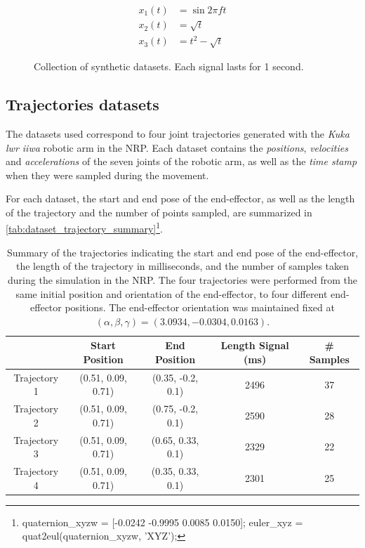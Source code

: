 \documentclass[10pt,a4paper, final]{report} %
\begin{document}
\begin{align}
x_1(t) &= \sin{2 \pi f t} \label{eq:zx1}\\
x_2(t) &= \sqrt{t} \label{eq:zx2}\\
x_3(t) &= t^2 - \sqrt{t} \label{eq:zx3}
\end{align}

\begin{figure}[!h]
\caption{Collection of synthetic datasets. Each signal lasts for 1 second.}
\label{fig:synthetic_datasets}
\end{figure}

\subsection{Trajectories datasets}
The datasets used correspond to four joint trajectories generated with the \textit{Kuka lwr iiwa} robotic arm in the NRP. Each dataset contains the \textit{positions}, \textit{velocities} and \textit{accelerations} of the seven joints of the robotic arm, as well as the \textit{time stamp} when they were sampled during the movement. 

For each dataset, the start and end pose of the end-effector, as well as the length of the trajectory and the number of points sampled, are summarized in \autoref{tab:dataset_trajectory_summary}\footnote{quaternion\_xyzw = [-0.0242 -0.9995 0.0085 0.0150];  euler\_xyz = quat2eul(quaternion\_xyzw, 'XYZ');}. 

\begin{table}[H]
\centering
\caption{Summary of the trajectories indicating the start and end pose of the end-effector, the length of the trajectory in milliseconds, and the number of samples taken during the simulation in the NRP. The four trajectories were performed from the same initial position and orientation of the end-effector, to four different end-effector positions. The end-effector orientation was maintained fixed at $(\alpha, \beta, \gamma) = (3.0934, -0.0304, 0.0163)$.}
\begin{tabular}{ccccc}
\toprule
             & Start Position        & End Position          & Length Signal (ms) & \# Samples \\
\midrule
Trajectory 1 & (0.51, 0.09, 0.71) & (0.35, -0.2, 0.1) & 2496               & 37         \\
Trajectory 2 & (0.51, 0.09, 0.71) & (0.75, -0.2, 0.1) & 2590               & 28         \\
Trajectory 3 & (0.51, 0.09, 0.71) & (0.65, 0.33, 0.1) & 2329               & 22         \\
Trajectory 4 & (0.51, 0.09, 0.71) & (0.35, 0.33, 0.1) & 2301               & 25        \\
\bottomrule
\end{tabular}
\label{tab:dataset_trajectory_summary}
\end{table}
\end{document}
